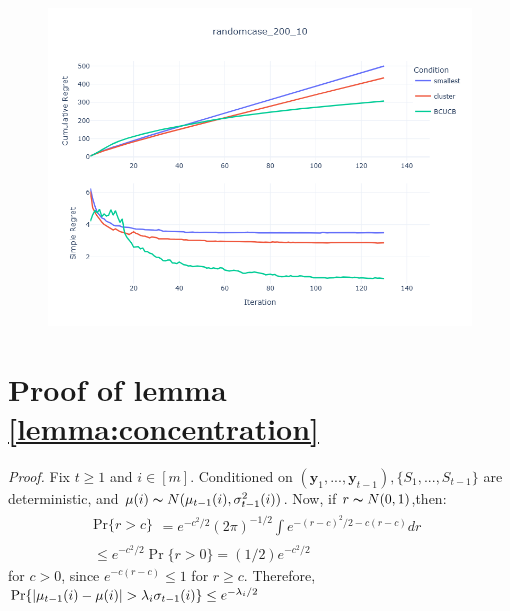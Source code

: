 \documentclass[opre,sglanonrev]{informs4}
\begin{document}
\begin{figure}[htbp]
\begin{minipage}[t]{0.48\textwidth}
        \includegraphics[width=\textwidth]{figures/random_200_10.png}
        \label{}
    \end{minipage}
\end{figure}


 
 

\ECSwitch

\section{Proof of lemma \ref{lemma:concentration}}
\textit{Proof.} Fix $t\geq 1$ and $i\in [m]$. Conditioned on $(\mathbf{y}_1,...,\mathbf{y}_{t-1}), \{S_1,...,S_{t-1}\}$ are deterministic, and $\mu(i)\thicksim N(\mu_{t-1}(i),\sigma_{t-1}^2(i))$. Now, if $r\thicksim N(0,1)$,then: 
$$\begin{gathered}
\mathrm{Pr}\{r>c\}
\begin{aligned}
=e^{-c^2/2}(2\pi)^{-1/2}\int e^{-(r-c)^2/2-c(r-c)}dr
\end{aligned} \\
\leq e^{-c^2/2}\Pr\{r>0\}=(1/2)e^{-c^2/2}
\end{gathered}$$
for $c>0$, since $e^{-c(r-c)}\leq 1$ for $r\geq c$. Therefore, $\textnormal{Pr}\{|\mu_{t-1}(i)-\mu(i)|>\lambda_i \sigma_{t-1}(i)\}\leq e^{-\lambda_i/2}$
\end{document}
